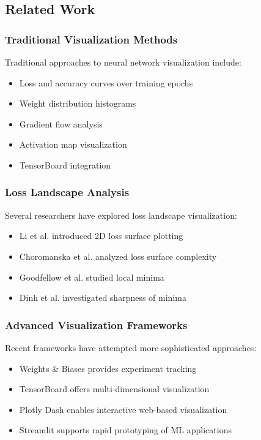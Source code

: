 \documentclass[12pt,a4paper]{article}
\begin{document}
\subsection{Related Work}

\subsubsection{Traditional Visualization Methods}

Traditional approaches to neural network visualization include:
\begin{itemize}
    \item Loss and accuracy curves over training epochs \cite{goodfellow2016deep}
    \item Weight distribution histograms \cite{sutskever2013importance}
    \item Gradient flow analysis \cite{pascanu2013difficulty}
    \item Activation map visualization \cite{zeiler2014visualizing}
    \item TensorBoard integration \cite{abadi2016tensorflow}
\end{itemize}

\subsubsection{Loss Landscape Analysis}

Several researchers have explored loss landscape visualization:
\begin{itemize}
    \item Li et al. \cite{li2018visualizing} introduced 2D loss surface plotting
    \item Choromanska et al. \cite{choromanska2015loss} analyzed loss surface complexity
    \item Goodfellow et al. \cite{goodfellow2015qualitatively} studied local minima
    \item Dinh et al. \cite{dinh2017sharp} investigated sharpness of minima
\end{itemize}

\subsubsection{Advanced Visualization Frameworks}

Recent frameworks have attempted more sophisticated approaches:
\begin{itemize}
    \item Weights \& Biases \cite{wandb} provides experiment tracking
    \item TensorBoard \cite{tensorboard} offers multi-dimensional visualization
    \item Plotly Dash \cite{plotly} enables interactive web-based visualization
    \item Streamlit \cite{streamlit} supports rapid prototyping of ML applications
\end{itemize}
\end{document}
